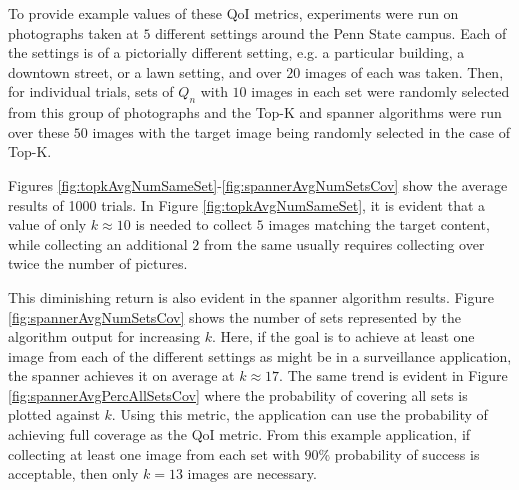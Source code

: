 To provide example values of these QoI metrics, experiments were run on photographs taken at $5$ different settings around the Penn State campus.  Each of the settings is of a pictorially different setting, e.g. a particular building, a downtown street, or a lawn setting, and over $20$ images of each was taken.  Then, for individual trials, sets of $Q_n$ with $10$ images in each set were randomly selected from this group of photographs and the Top-K and spanner algorithms were run over these $50$ images with the target image being randomly selected in the case of Top-K.

Figures \ref{fig:topkAvgNumSameSet}-\ref{fig:spannerAvgNumSetsCov} show the average results of 1000 trials.  In Figure \ref{fig:topkAvgNumSameSet}, it is evident that a value of only $k \approx 10$ is needed to collect $5$ images matching the target content, while collecting an additional $2$ from the same usually requires collecting over twice the number of pictures.  

This diminishing return is also evident in the spanner algorithm results.  Figure \ref{fig:spannerAvgNumSetsCov} shows the number of sets represented by the algorithm output for increasing $k$.  Here, if the goal is to achieve at least one image from each of the different settings as might be in a surveillance application, the spanner achieves it on average at $k \approx 17$.  The same trend is evident in Figure \ref{fig:spannerAvgPercAllSetsCov} where the probability of covering all sets is plotted against $k$.  Using this metric, the application can use the probability of achieving full coverage as the QoI metric.  From this example application, if collecting at least one image from each set with $90\%$ probability of success is acceptable, then only $k=13$ images are necessary.

